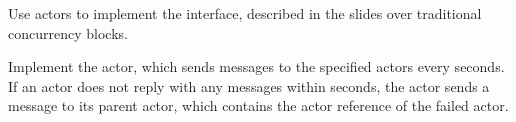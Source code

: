 \documentclass[11pt]{article}
\begin{document}
\begin{myExercise}
Use actors to implement the  interface, described in the slides over traditional concurrency blocks.
\end{myExercise}

\begin{myExercise}
Implement the  actor, which sends  messages to the specified actors every  seconds. If an actor does not reply with any  messages within  seconds, the  actor sends a  message to its parent actor, which contains the actor reference of the failed actor.
\end{myExercise}


\end{document}

